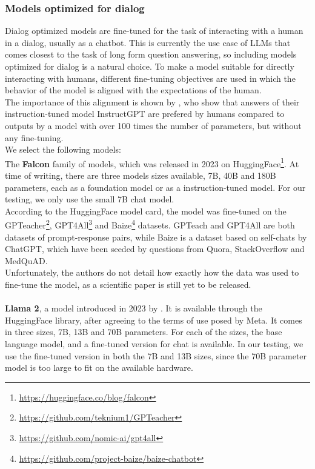 \subsubsection{Models optimized for dialog}
Dialog optimized models are fine-tuned for the task of interacting with a human in a dialog, usually as a chatbot.
This is currently the use case of LLMs that comes closest to the task of long form question answering, so including models optimized for dialog is a natural choice.
To make a model suitable for directly interacting with humans, different fine-tuning objectives are used in which the behavior of the model is aligned with the expectations of the human.
\\
The importance of this alignment is shown by \cite{ouyang:2022}, who show that answers of their instruction-tuned model InstructGPT are prefered by humans compared to outputs by a model with over 100 times the number of parameters, but without any fine-tuning.
\\
We select the following models:
\\
The \textbf{Falcon} family of models, which was released in 2023 on HuggingFace\footnote{\url{https://huggingface.co/blog/falcon}}.
At time of writing, there are three models sizes available, 7B, 40B and 180B parameters, each as a foundation model or as a instruction-tuned model.
For our testing, we only use the small 7B chat model.
\\
According to the HuggingFace model card, the model was fine-tuned on the GPTeacher\footnote{\url{https://github.com/teknium1/GPTeacher}}, GPT4All\footnote{\url{https://github.com/nomic-ai/gpt4all}} and Baize\footnote{\url{https://github.com/project-baize/baize-chatbot}} datasets.
GPTeach and GPT4All are both datasets of prompt-response pairs, while Baize is a dataset based on self-chats by ChatGPT, which have been seeded by questions from Quora, StackOverflow and MedQuAD.
\\
Unfortunately, the authors do not detail how exactly how the data was used to fine-tune the model, as a scientific paper is still yet to be released.
\\
\\
\textbf{Llama 2}, a model introduced in 2023 by \cite{touvron:2023}.
It is available through the HuggingFace library, after agreeing to the terms of use posed by Meta.
It comes in three sizes, 7B, 13B and 70B parameters.
For each of the sizes, the base language model, and a fine-tuned version for chat is available.
In our testing, we use the fine-tuned version in both the 7B and 13B sizes, since the 70B parameter model is too large to fit on the available hardware.
